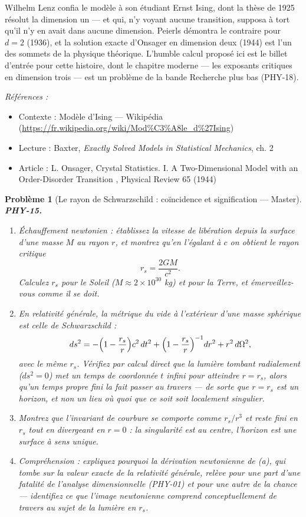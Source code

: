 \documentclass[11pt]{article}
\newtheorem{problem}{Problème}
\newenvironment{refs}{\par\small\noindent\emph{Références :}\begin{itemize}\setlength\itemsep{0pt}}{\end{itemize}\normalsize}
\begin{document}
\noindent Wilhelm Lenz confia le modèle à son étudiant Ernst Ising, dont la thèse de
1925 résolut la dimension un --- et qui, n'y voyant aucune transition, supposa à tort qu'il n'y en
avait dans aucune dimension. Peierls démontra le contraire pour $d = 2$ (1936), et la solution
exacte d'Onsager en dimension deux (1944) est l'un des sommets de la physique théorique. L'humble
calcul proposé ici est le billet d'entrée pour cette histoire, dont le chapitre moderne --- les
exposants critiques en dimension trois --- est un problème de la bande Recherche plus bas
(PHY-18).

\begin{refs}
\item Contexte : Modèle d'Ising --- Wikipédia (\url{https://fr.wikipedia.org/wiki/Mod%C3%A8le_d%27Ising})
\item Lecture : Baxter, \textit{Exactly Solved Models in Statistical Mechanics}, ch. 2
\item Article : L. Onsager, \og{} Crystal Statistics. I. A Two-Dimensional Model with an Order-Disorder Transition \fg{}, Physical Review 65 (1944)
\end{refs}

\bigskip

\begin{problem}[{Le rayon de Schwarzschild : coïncidence et signification --- Master}]
\textbf{PHY-15.} \begin{enumerate}
\item[(a)] Échauffement newtonien : établissez la vitesse de libération depuis la surface d'une masse
$M$ au rayon $r$, et montrez qu'en l'égalant à $c$ on obtient le rayon critique
\[ r_s = \frac{2GM}{c^2}. \]
Calculez $r_s$ pour le Soleil ($M \approx 2 \times 10^{30}$ kg) et pour la Terre, et
émerveillez-vous comme il se doit.
\item[(b)] En relativité générale, la métrique du vide à l'extérieur d'une masse sphérique est celle de
Schwarzschild :
\[ ds^2 = -\Bigl(1 - \frac{r_s}{r}\Bigr)c^2\,dt^2 + \Bigl(1 - \frac{r_s}{r}\Bigr)^{-1} dr^2 + r^2\,d\Omega^2 , \]
avec le \textit{même} $r_s$. Vérifiez par calcul direct que la lumière tombant radialement
($ds^2 = 0$) met un temps de coordonnée $t$ infini pour atteindre $r = r_s$, alors qu'un
temps propre fini la fait passer au travers --- de sorte que $r = r_s$ est un horizon, et non un
lieu où quoi que ce soit soit localement singulier.
\item[(c)] Montrez que l'invariant de courbure se comporte comme $r_s/r^3$ et reste fini en $r_s$
tout en divergeant en $r = 0$ : la singularité est au centre, l'horizon est une surface à sens
unique.
\item[(d)] Compréhension : expliquez pourquoi la \og{} dérivation \fg{} newtonienne de (a), qui tombe sur la
valeur exacte de la relativité générale, relève pour une part d'une fatalité de l'analyse
dimensionnelle (PHY-01) et pour une autre de la chance --- identifiez ce que l'image newtonienne
comprend conceptuellement de travers au sujet de la lumière en $r_s$.
\end{enumerate}

\end{problem}
\end{document}
